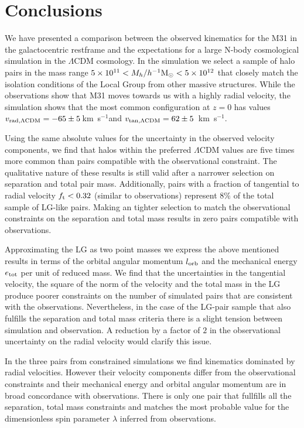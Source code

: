 \documentclass{emulateapj}
\newcommand{\kms}{\,km~s$^{-1}$}
\newcommand{\hMsun}{{\ifmmode{h^{-1}{\rm {M_{\odot}}}}\else{$h^{-1}{\rm{M_{\odot}}}$}\fi}}
\begin{document}
\section{Conclusions}
We have presented a comparison between the observed kinematics for the M31 in the galactocentric restframe and the expectations for a large N-body cosmological simulation in the $\Lambda$CDM cosmology. In the simulation we select a sample of halo pairs in the mass range $5\times 10^{11}<M_{h}/\hMsun<5\times 10^{12}$ that closely match the isolation conditions of the Local Group from other massive structures. While the observations show that M31 moves towards us with a highly radial velocity, the simulation shows that the most common configuration at $z=0$ has values $v_{\rm rad, \Lambda CDM}=-65\pm5$\kms and $v_{\rm tan, \Lambda CDM}=62\pm5$ \kms. 


Using the same absolute values for the uncertainty in the observed velocity components, we find that halos within the preferred $\Lambda$CDM values are five times more common than pairs compatible with the observational constraint.  The qualitative nature of these results is still valid after a narrower selection on separation and total pair mass. Additionally, pairs with a fraction of tangential to radial velocity $f_{\rm t}<0.32$ (similar to observations) represent $8\%$ of the total sample of LG-like pairs. Making an tighter selection to match the observational constraints on the separation and total mass results in zero pairs compatible with observations.

Approximating the LG as two point masses we express the above mentioned results in terms of the orbital angular momentum $l_{\rm orb}$ and the mechanical energy $e_{\rm tot}$ per unit of reduced mass. We find that the uncertainties in the tangential velocity, the square of the norm of the velocity and the total mass in the LG produce poorer constraints on the number of simulated pairs that are consistent with the observations. Nevertheless, in the case of the LG-pair sample that also fulfills the separation and total mass criteria there is a slight tension between simulation and observation. A reduction by a factor of $2$ in the observational uncertainty on the radial velocity would clarify this issue.

In the three pairs from constrained simulations we find kinematics dominated by radial velocities. However their velocity components differ from the observational constraints and their mechanical energy and orbital angular momentum are in broad concordance with observations. There is only one pair that fullfills all the separation, total mass constraints and matches the most probable value for the dimensionless spin parameter $\lambda$ inferred from observations. 
\end{document}
